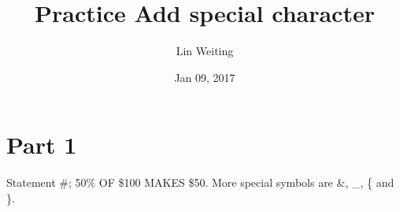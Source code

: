 \documentclass{article}
\begin{document}
\title{Practice Add special character}
\author{Lin Weiting}
\date{Jan 09, 2017}
\maketitle
\section{Part 1}
Statement \#;
50\% OF \$100 MAKES \$50.
More special symbols are \&, \_, \{ and \}.
\end{document}
